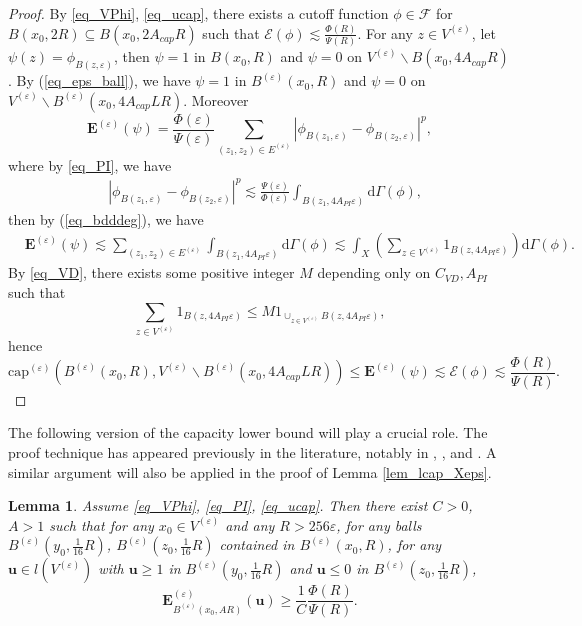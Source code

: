\documentclass[11pt,a4paper]{article}
\numberwithin{equation}{section}
\theoremstyle{plain}
\newtheorem{lemma}[theorem]{Lemma}
\theoremstyle{definition}
\begin{document}
\begin{proof}
By \ref{eq_VPhi}, \ref{eq_ucap}, there exists a cutoff function $\phi\in\mathcal{F}$ for\\
\noindent $B(x_0,2R)\subseteq B(x_0,2A_{cap}R)$ such that $\mathcal{E}(\phi)\lesssim \frac{\Phi(R)}{\Psi(R)}$. For any $z\in V^{(\varepsilon)}$, let $\psi(z)=\phi_{B(z,\varepsilon)}$, then $\psi=1$ in $B(x_0,R)$ and $\psi=0$ on $V^{(\varepsilon)}\backslash B(x_0,4A_{cap}R)$. By (\ref{eq_eps_ball}), we have $\psi=1$ in $B^{(\varepsilon)}(x_0,R)$ and $\psi=0$ on $V^{(\varepsilon)}\backslash B^{(\varepsilon)}(x_0,4A_{cap}LR)$. Moreover
$$\mathbf{E}^{(\varepsilon)}(\psi)=\frac{\Phi(\varepsilon)}{\Psi(\varepsilon)}\sum_{(z_1,z_2)\in E^{(\varepsilon)}}|\phi_{B(z_1,\varepsilon)}-\phi_{B(z_2,\varepsilon)}|^p,$$
where by \ref{eq_PI}, we have
\begin{align*}
&|\phi_{B(z_1,\varepsilon)}-\phi_{B(z_2,\varepsilon)}|^p\lesssim\frac{\Psi(\varepsilon)}{\Phi(\varepsilon)}\int_{B(z_1,4A_{PI}\varepsilon)}\mathrm{d}\Gamma(\phi),
\end{align*}
then by (\ref{eq_bdddeg}), we have
\begin{align*}
&\mathbf{E}^{(\varepsilon)}(\psi)\lesssim\sum_{(z_1,z_2)\in E^{(\varepsilon)}}\int_{B(z_1,4A_{PI}\varepsilon)}\mathrm{d}\Gamma(\phi)\lesssim\int_X \left(\sum_{z\in V^{(\varepsilon)}}1_{B(z,4A_{PI}\varepsilon)}\right)\mathrm{d}\Gamma(\phi).
\end{align*}
By \ref{eq_VD}, there exists some positive integer $M$ depending only on $C_{VD},A_{PI}$ such that
$$\sum_{z\in V^{(\varepsilon)}}1_{B(z,4A_{PI}\varepsilon)}\le M1_{\cup_{z\in V^{(\varepsilon)}}B(z,4A_{PI}\varepsilon)},$$
hence
$$\mathrm{cap}^{(\varepsilon)}(B^{(\varepsilon)}(x_0,R),V^{(\varepsilon)}\backslash B^{(\varepsilon)}(x_0,4A_{cap}LR))\le\mathbf{E}^{(\varepsilon)}(\psi)\lesssim \mathcal{E}(\phi)\lesssim \frac{\Phi(R)}{\Psi(R)}.$$
\end{proof}

The following version of the capacity lower bound will play a crucial role. The proof technique has appeared previously in the literature, notably in \cite[THEOREM 5.9]{HK98}, \cite[Lemma 3.2]{Kor07}, and \cite[PROPOSITION 3.2]{Mur23a}. A similar argument will also be applied in the proof of Lemma \ref{lem_lcap_Xeps}.

\begin{lemma}\label{lem_lcap_Veps}
Assume \ref{eq_VPhi}, \ref{eq_PI}, \ref{eq_ucap}. Then there exist $C>0$, $A>1$ such that for any $x_0\in V^{(\varepsilon)}$ and any $R>256\varepsilon$, for any balls $B^{(\varepsilon)}(y_0,\frac{1}{16}R)$, $B^{(\varepsilon)}(z_0,\frac{1}{16}R)$ contained in $B^{(\varepsilon)}(x_0,R)$, for any $\mathbf{u}\in l(V^{(\varepsilon)})$ with $\mathbf{u}\ge1$ in $B^{(\varepsilon)}(y_0,\frac{1}{16}R)$ and $\mathbf{u}\le 0$ in $B^{(\varepsilon)}(z_0,\frac{1}{16}R)$,
$$\mathbf{E}^{(\varepsilon)}_{B^{(\varepsilon)}(x_0,AR)}(\mathbf{u})\ge \frac{1}{C}\frac{\Phi(R)}{\Psi(R)}.$$
\end{lemma}
\end{document}
